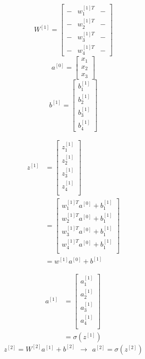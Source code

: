 \documentclass[12pt, letterpaper]{article}
\begin{document}
\begin{itemize}
        $$W^{[1]} = \begin{bmatrix}
            - & w_1^{[1]T} & - \\
            - & w_2^{[1]T} & - \\
            - & w_3^{[1]T} & - \\
            - & w_4^{[1]T} & - 
        \end{bmatrix} $$
        $$a^{[0]}=\begin{bmatrix}
            x_1 \\
            x_2 \\
            x_3
        \end{bmatrix} $$
        $$b^{[1]}=\begin{bmatrix}
            b_1^{[1]} \\
            b_2^{[1]} \\
            b_3^{[1]} \\
            b_4^{[1]} 
        \end{bmatrix}$$

        \begin{align*}
            z^{[1]}&=\begin{bmatrix}
                z_1^{[1]} \\
                z_2^{[1]} \\
                z_3^{[1]} \\
                z_4^{[1]} \\
            \end{bmatrix} \\
            &= \begin{bmatrix}
                w_1^{[1]T}a^{[0]}+b_1^{[1]} \\
                w_2^{[1]T}a^{[0]}+b_1^{[1]} \\
                w_3^{[1]T}a^{[0]}+b_1^{[1]} \\
                w_4^{[1]T}a^{[0]}+b_1^{[1]} \\
            \end{bmatrix} \\
            &= w^{[1]} a^{[0]} + b^{[1]}
        \end{align*}

        \begin{align*}
            a^{[1]}&=\begin{bmatrix}
                a_1^{[1]} \\
                a_2^{[1]} \\
                a_3^{[1]} \\
                a_4^{[1]} \\
            \end{bmatrix} \\
            &= \sigma(z^{[1]})
        \end{align*}
        $$z^{[2]}=W^{[2]}a^{[1]}+b^{[2]} ~~\rightarrow~~ a^{[2]}=\sigma(z^{[2]})$$
    \end{itemize}
\end{document}
